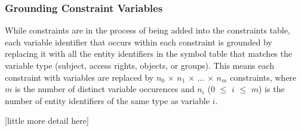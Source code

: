 \documentclass[10pt, twocolumn]{article}
\begin{document}
      \subsubsection{Grounding Constraint Variables}

        While constraints are in the process of being added into the
        constraints table, each variable identifier that occurs within each
        constraint is grounded by replacing it with all the entity identifiers
        in the symbol table that matches the variable type (subject, access
        rights, objects, or groups). This means each constraint with variables
        are replaced by $n_0$ $\times$ $n_1$ $\times$ $\hdots$ $\times$ $n_m$
        constraints, where $m$ is the number of distinct variable occurences
        and $n_i$ ($0$ $\leq$ $i$ $\leq$ $m$) is the number of entity
        identifiers of the same type as variable $i$.

        [little more detail here]
\end{document}
